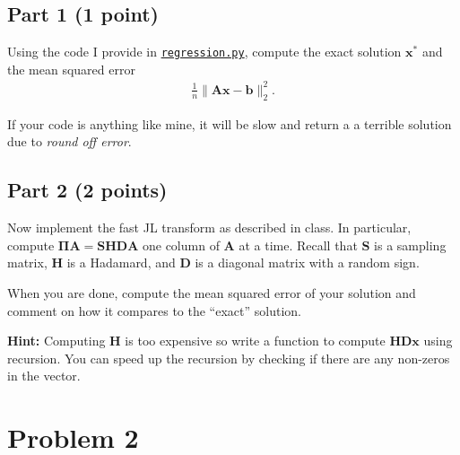 \documentclass{article}
\begin{document}
\subsection*{Part 1 (1 point)}

Using the code I provide in \href{https://www.rtealwitter.com/rads2024/psets/regression.py}{\texttt{regression.py}}, compute the exact solution $\mathbf{x}^*$ and
the mean squared error
\begin{align*}
    \frac1{n} \| \mathbf{Ax} - \mathbf{b} \|_2^2.
\end{align*}

If your code is anything like mine, it will be slow and return a a terrible solution due to \textit{round off error}.

\subsection*{Part 2 (2 points)}
Now implement the fast JL transform as described in class.
In particular, compute $\mathbf{\Pi A} = \mathbf{S H D A}$ one column of $\mathbf{A}$ at a time.
Recall that $\mathbf{S}$ is a sampling matrix, $\mathbf{H}$ is a Hadamard, and $\mathbf{D}$ is a diagonal matrix with a random sign.

When you are done, compute the mean squared error of your solution and comment on how it compares to the ``exact'' solution.

\textbf{Hint:} Computing $\mathbf{H}$ is too expensive so write a function to compute $\mathbf{HDx}$ using recursion. You can speed up the recursion by checking if there are any non-zeros in the vector.

%

\newpage

\section*{Problem 2}
\end{document}
